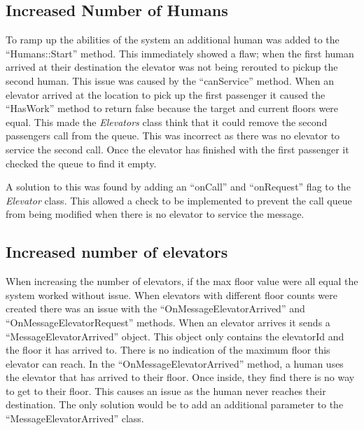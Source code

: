 \documentclass{article}
\begin{document}
\subsection{Increased Number of Humans}
To ramp up the abilities of the system an additional human was added to the ``Humans::Start'' method.
This immediately showed a flaw; when the first human arrived at their destination the elevator was not being rerouted to pickup the second human.
This issue was caused by the ``canService'' method.
When an elevator arrived at the location to pick up the first passenger it caused the ``HasWork'' method to return false because the target and current floors were equal.
This made the \textit{Elevators} class think that it could remove the second passengers call from the queue. 
This was incorrect as there was no elevator to service the second call.
Once the elevator has finished with the first passenger it checked the queue to find it empty.

A solution to this was found by adding an ``onCall'' and ``onRequest'' flag to the \textit{Elevator} class.
This allowed a check to be implemented to prevent the call queue from being modified when there is no elevator to service the message.

\subsection{Increased number of elevators} 
When increasing the number of elevators, if the max floor value were all equal the system worked without issue.
When elevators with different floor counts were created there was an issue with the ``OnMessageElevatorArrived'' and ``OnMessageElevatorRequest'' methods.
When an elevator arrives it sends a ``MessageElevatorArrived'' object. 
This object only contains the elevatorId and the floor it has arrived to.
There is no indication of the maximum floor this elevator can reach.
In the ``OnMessageElevatorArrived'' method, a human uses the elevator that has arrived to their floor.
Once inside, they find there is no way to get to their floor. 
This causes an issue as the human never reaches their destination.
The only solution would be to add an additional parameter to the ``MessageElevatorArrived'' class.
\end{document}
